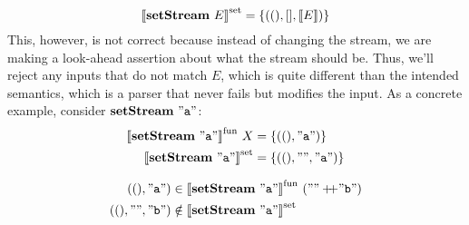 \documentclass{article}
\begin{document}
\[
{\llbracket{\mathbf{setStream}~{E}}\rrbracket}^{\mathrm{set}} = \{{ ((),[], \llbracket{E}\rrbracket) }\}
\]
This, however, is not correct because instead of changing the stream,
we are making a look-ahead assertion about what the stream should be.
Thus, we'll reject any inputs that do not match $E$, which is quite
different than the intended semantics, which is a parser that never fails
but modifies the input. As a concrete example, consider $\mathbf{setStream}~{\mathtt{"{a}"}}$:
\begin{align*}
{\llbracket{\mathbf{setStream}~{\mathtt{"{a}"}}}\rrbracket}^{\mathrm{fun}}~X &= \{{ ((),\mathtt{"{a}"}) }\} \\
{\llbracket{\mathbf{setStream}~{\mathtt{"{a}"}}}\rrbracket}^{\mathrm{set}}   &= \{{ ((),\mathtt{"{}"},\mathtt{"{a}"}) }\}
\end{align*}

\begin{align*}
((),\mathtt{"{a}"}) & \in {\llbracket{\mathbf{setStream}~{\mathtt{"{a}"}}}\rrbracket}^{\mathrm{fun}}~
                                      (\mathtt{"{}"} +\!\!\!+ \mathtt{"{b}"}) \\
((),\mathtt{"{}"},\mathtt{"{b}"}) & \notin {\llbracket{\mathbf{setStream}~{\mathtt{"{a}"}}}\rrbracket}^{\mathrm{set}}
\end{align*}
\end{document}
